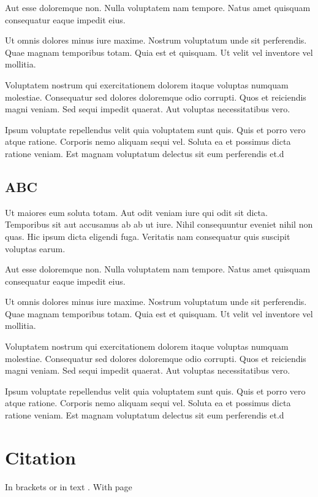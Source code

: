 \documentclass{plmmthesis}
\begin{document}
Aut esse doloremque non. Nulla voluptatem nam tempore. Natus amet quisquam consequatur eaque impedit eius.

Ut omnis dolores minus iure maxime. Nostrum voluptatum unde sit perferendis. Quae magnam temporibus totam. Quia est et quisquam. Ut velit vel inventore vel mollitia.

Voluptatem nostrum qui exercitationem dolorem itaque voluptas numquam molestiae. Consequatur sed dolores doloremque odio corrupti. Quos et reiciendis magni veniam. Sed sequi impedit quaerat. Aut voluptas necessitatibus vero.

Ipsum voluptate repellendus velit quia voluptatem sunt quis. Quis et porro vero atque ratione. Corporis nemo aliquam sequi vel. Soluta ea et possimus dicta ratione veniam. Est magnam voluptatum delectus sit eum perferendis et.d


\section{ABC}

Ut maiores eum soluta totam. Aut odit veniam iure qui odit sit dicta. Temporibus sit aut accusamus
ab ab ut iure. Nihil consequuntur eveniet nihil non quas. Hic ipsum dicta eligendi fuga. Veritatis
nam consequatur quis suscipit voluptas earum.

Aut esse doloremque non. Nulla voluptatem nam tempore. Natus amet quisquam consequatur eaque impedit eius.

Ut omnis dolores minus iure maxime. Nostrum voluptatum unde sit perferendis. Quae magnam temporibus totam. Quia est et quisquam. Ut velit vel inventore vel mollitia.

Voluptatem nostrum qui exercitationem dolorem itaque voluptas numquam molestiae. Consequatur sed dolores doloremque odio corrupti. Quos et reiciendis magni veniam. Sed sequi impedit quaerat. Aut voluptas necessitatibus vero.

Ipsum voluptate repellendus velit quia voluptatem sunt quis. Quis et porro vero atque ratione. Corporis nemo aliquam sequi vel. Soluta ea et possimus dicta ratione veniam. Est magnam voluptatum delectus sit eum perferendis et.d

\chapter{Citation}

In brackets \cite{Almeida1997,Doltsinis2012} or in text \citep{Bertrand1990,Chen2013}.
With page \cite[see][p.123]{Bertrand1990}
\end{document}

